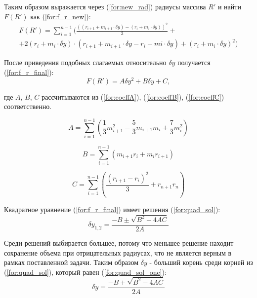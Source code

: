 Таким образом выражается через (\ref{for:new_rad}) радиусы массива $R'$ и найти $F(R')$ как (\ref{for:f_r_new}):
\begin{equation}
    \label{for:f_r_new}
    \begin{split}
        F(R') = \sum_{i=1}^{n-1} (\frac{((r_{i + 1} + m_{i + 1} \cdot \delta y) - (r_i + m_{i} \cdot \delta y))^2}{3} + \\
        + 2 (r_i + m_i \cdot \delta y) \cdot (r_{i + 1} + m_{i + 1} \cdot \delta y - r_i + m{i} \cdot \delta y) + (r_i + m_i \cdot \delta y)^2)
    \end{split}
\end{equation}

После приведения подобных слагаемых относительно $\delta y$ получается (\ref{for:f_r_final}):
\begin{equation}
    \label{for:f_r_final}
        F(R') = A \delta y^2 + B \delta y + C,
\end{equation}

где $A$, $B$, $C$ рассчитываются из (\ref{for:coeffA}), (\ref{for:coeffB}), (\ref{for:coeffC}) соответственно.

\begin{equation}
    \label{for:coeffA}
    A = \sum_{i=1}^{n-1}\left(\frac{1}{3}m_{i + 1}^2 - \frac{5}{3}m_{i + 1}m_i + \frac{7}{3}m_i^2 \right)
\end{equation}

\begin{equation}
    \label{for:coeffB}
    B = \sum_{i=1}^{n-1}\left(m_{i + 1}r_i + m_ir_{i + 1} \right)
\end{equation}

\begin{equation}
    \label{for:coeffC}
    C = \sum_{i=1}^{n-1}\left(\frac{(r_{i + 1} - r_i)^2}{3} + r_{n + 1}r_n\right)
\end{equation}

Квадратное уравнение (\ref{for:f_r_final}) имеет решения (\ref{for:quad_sol}):
\begin{equation}
    \label{for:quad_sol}
    \delta y_{1, 2} = \frac{-B \pm \sqrt{B^2 - 4AC}}{2A}
\end{equation}

Среди решений выбирается большее, потому что меньшее решение находит сохранение объема при отрицательных радиусах, что не является верным в рамках поставленной задачи. Таким образом $\delta y$ - больший корень среди корней из (\ref{for:quad_sol}), который равен (\ref{for:quad_sol_one}):
\begin{equation}
    \label{for:quad_sol_one}
    \delta y = \frac{-B + \sqrt{B^2 - 4AC}}{2A}
\end{equation}


